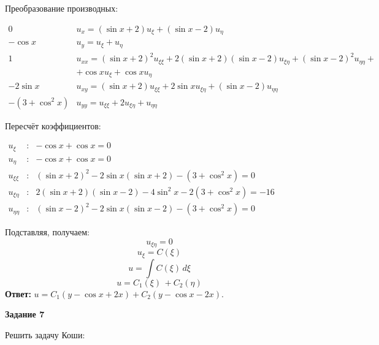 \documentclass[a4paper,12pt]{article}
\begin{document}
Преобразование производных:
\begin{flushleft}
\(
\begin{array}{r|l}
0 & u_x = (\sin{x} + 2) u_{\xi} + (\sin{x} - 2) u_{\eta} \\
-\cos x & u_y = u_{\xi} + u_{\eta} \\
1 & u_{xx} = (\sin{x} + 2)^2 u_{\xi\xi} + 2(\sin{x} + 2)(\sin{x} - 2) u_{\xi\eta} + (\sin{x} - 2)^2u_{\eta\eta} + \\ & + \cos x u_{\xi} + \cos x u_{\eta}\\
-2 \sin x & u_{xy} = (\sin{x} + 2) u_{\xi\xi} + 2\sin{x} u_{\xi\eta} + (\sin{x} - 2) u_{\eta\eta}  \\
-(3+\cos^2 x) & u_{yy} = u_{\xi\xi} + 2 u_{\xi\eta} + u_{\eta\eta}
\end{array}
\)
\end{flushleft}

Пересчёт коэффициентов:
\begin{flushleft}
\(
\begin{array}{rcl}
    u_{\xi} &:& -\cos x + \cos x = 0 \\
    u_{\eta} &:& -\cos x + \cos x = 0  \\
    u_{\xi\xi} &:& (\sin{x} + 2)^2 - 2\sin{x} (\sin{x} + 2) - (3 + \cos^2{x})=0 \\
    u_{\xi\eta} &:& 2(\sin{x} + 2)(\sin{x} - 2) - 4\sin^2{x} - 2(3 +\cos^2{x})=-16\\
    u_{\eta\eta} &:& (\sin{x} - 2)^2 - 2\sin{x} (\sin{x} - 2) - (3 + \cos^2{x})=0
\end{array}
\)
\end{flushleft}

Подставляя, получаем:
\begin{equation*}
    u_{\xi\eta} = 0
\end{equation*}
\begin{equation*}
    u_{\xi} = C(\xi)
\end{equation*}
\begin{equation*}
    u = \int C(\xi) \, d\xi
\end{equation*}
\begin{equation*}
    u = C_1(\xi) \, + C_2(\eta)
\end{equation*}
\textbf{Ответ:} $u = C_1(y - \cos{x} + 2x) + C_2(y - \cos{x} - 2x)$.

\begin{center}    
\noindent \textbf{Задание 7}
\end{center}

Решить задачу Коши:
\end{document}

